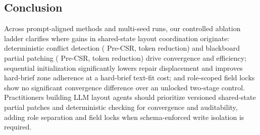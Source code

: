 \documentclass[conference]{IEEEtran}
\begin{document}
\subsection{Conclusion}
Across \vMethodCount{} prompt-aligned methods and \vRunsTotal{} multi-seed runs,
our controlled ablation ladder clarifies where gains in shared-state layout
coordination originate: deterministic conflict detection (\vDPreDet{} Pre-CSR,
\vTokCutDetPct{} token reduction) and blackboard partial patching (\vDPreBB{}
Pre-CSR, \vTokCutBBPct{} token reduction) drive convergence and efficiency;
sequential initialization significantly lowers repair displacement and improves
hard-brief zone adherence at a \vDFitHardSeq{} hard-brief text-fit cost; and
role-scoped field locks show no significant convergence difference over an
unlocked two-stage control. Practitioners building LLM layout agents should
prioritize versioned shared-state partial patches and deterministic checking for
convergence and auditability, adding role separation and field locks when
schema-enforced write isolation is required.

\balance


\end{document}
